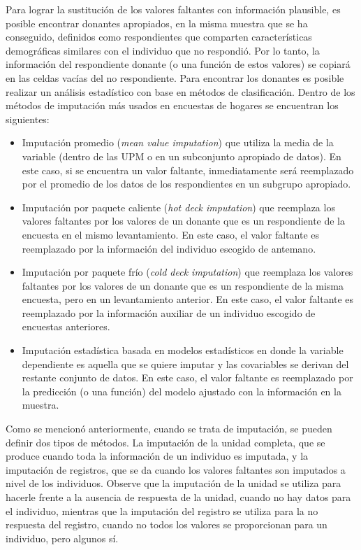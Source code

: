 \documentclass[
  12pt,
  spanish,
]{book}
\providecommand{\tightlist}{%
  \setlength{\itemsep}{0pt}\setlength{\parskip}{0pt}}
\begin{document}
Para lograr la sustitución de los valores faltantes con información plausible, es posible encontrar donantes apropiados, en la misma muestra que se ha conseguido, definidos como respondientes que comparten características demográficas similares con el individuo que no respondió. Por lo tanto, la información del respondiente donante (o una función de estos valores) se copiará en las celdas vacías del no respondiente. Para encontrar los donantes es posible realizar un análisis estadístico con base en métodos de clasificación. Dentro de los métodos de imputación más usados en encuestas de hogares se encuentran los siguientes:

\begin{itemize}
\tightlist
\item
  Imputación promedio (\emph{mean value imputation}) que utiliza la media de la variable (dentro de las UPM o en un subconjunto apropiado de datos). En este caso, si se encuentra un valor faltante, inmediatamente será reemplazado por el promedio de los datos de los respondientes en un subgrupo apropiado.
\item
  Imputación por paquete caliente (\emph{hot deck imputation}) que reemplaza los valores faltantes por los valores de un donante que es un respondiente de la encuesta en el mismo levantamiento. En este caso, el valor faltante es reemplazado por la información del individuo escogido de antemano.
\item
  Imputación por paquete frío (\emph{cold deck imputation}) que reemplaza los valores faltantes por los valores de un donante que es un respondiente de la misma encuesta, pero en un levantamiento anterior. En este caso, el valor faltante es reemplazado por la información auxiliar de un individuo escogido de encuestas anteriores.
\item
  Imputación estadística basada en modelos estadísticos en donde la variable dependiente es aquella que se quiere imputar y las covariables se derivan del restante conjunto de datos. En este caso, el valor faltante es reemplazado por la predicción (o una función) del modelo ajustado con la información en la muestra.
\end{itemize}

Como se mencionó anteriormente, cuando se trata de imputación, se pueden definir dos tipos de métodos. La imputación de la unidad completa, que se produce cuando toda la información de un individuo es imputada, y la imputación de registros, que se da cuando los valores faltantes son imputados a nivel de los individuos. Observe que la imputación de la unidad se utiliza para hacerle frente a la ausencia de respuesta de la unidad, cuando no hay datos para el individuo, mientras que la imputación del registro se utiliza para la no respuesta del registro, cuando no todos los valores se proporcionan para un individuo, pero algunos sí.
\end{document}
